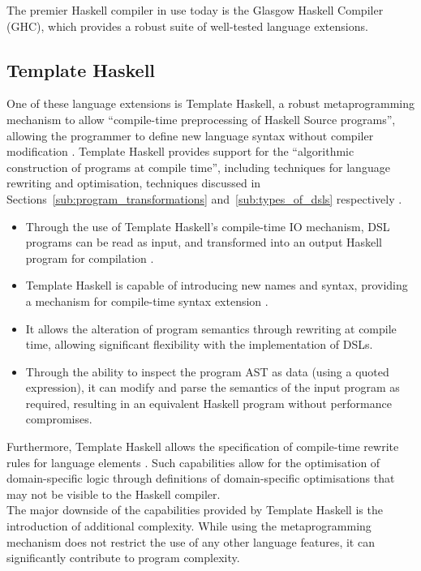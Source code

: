 \documentclass[a4paper,11pt]{report}
\begin{document}
The premier Haskell compiler in use today is the Glasgow Haskell Compiler (GHC), which provides a robust suite of well-tested language extensions.

\subsection{Template Haskell} %
\label{sub:template_haskell}
One of these language extensions is Template Haskell, a robust metaprogramming mechanism to allow ``compile-time preprocessing of Haskell Source programs'', allowing the programmer to define new language syntax without compiler modification \citep{Sheard:2002:TMH:581690.581691,Czarnecki2004}.
Template Haskell provides support for the ``algorithmic construction of programs at compile time'', including techniques for language rewriting and optimisation, techniques discussed in Sections~\ref{sub:program_transformations} and~\ref{sub:types_of_dsls} respectively \citep{Sheard:2002:TMH:581690.581691,jones2001playing}.
\begin{itemize}
    \item Through the use of Template Haskell's compile-time IO mechanism, DSL programs can be read as input, and transformed into an output Haskell program for compilation \citep[pg. 9]{Czarnecki2004}.
    \item Template Haskell is capable of introducing new names and syntax, providing a mechanism for compile-time syntax extension \citep{Czarnecki2004}.
    \item It allows the alteration of program semantics through rewriting at compile time, allowing significant flexibility with the implementation of DSLs. 
    \item Through the ability to inspect the program AST as data (using a quoted expression), it can modify and parse the semantics of the input program as required, resulting in an equivalent Haskell program without performance compromises.
\end{itemize}

Furthermore, Template Haskell allows the specification of compile-time rewrite rules for language elements \citep{jones2001playing}.
Such capabilities allow for the optimisation of domain-specific logic through definitions of domain-specific optimisations that may not be visible to the Haskell compiler. \\

The major downside of the capabilities provided by Template Haskell is the introduction of additional complexity. 
While using the metaprogramming mechanism does not restrict the use of any other language features, it can significantly contribute to program complexity.
\end{document}
